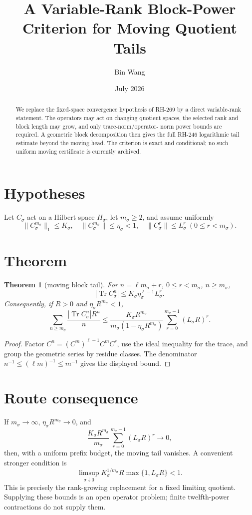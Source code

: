 \documentclass[11pt]{article}
\title{A Variable-Rank Block-Power Criterion for Moving Quotient Tails}\author{Bin Wang}\date{July 2026}
\newtheorem{theorem}{Theorem}[section]\newtheorem{corollary}[theorem]{Corollary}
\begin{document}
\maketitle
\begin{abstract}
We replace the fixed-space convergence hypothesis of RH-269 by a direct
variable-rank statement.  The operators may act on changing quotient spaces,
the selected rank and block length may grow, and only trace-norm/operator-
norm power bounds are required.  A geometric block decomposition then gives
the full RH-246 logarithmic tail estimate beyond the moving head.  The
criterion is exact and conditional; no such uniform moving certificate is
currently archived.
\end{abstract}
\section{Hypotheses}
Let $C_\sigma$ act on a Hilbert space $H_\sigma$, let $m_\sigma\ge2$, and
assume uniformly
\[
 \|C_\sigma^{m_\sigma}\|_1\le K_\sigma,\quad
 \|C_\sigma^{m_\sigma}\|\le\eta_\sigma<1,\quad
 \|C_\sigma^r\|\le L_\sigma^r\ (0\le r<m_\sigma).
\]
\section{Theorem}
\begin{theorem}[moving block tail]
For $n=\ell m_\sigma+r$, $0\le r<m_\sigma$, $n\ge m_\sigma$,
\[
 |\operatorname{Tr}C_\sigma^n|
 \le K_\sigma\eta_\sigma^{\ell-1}L_\sigma^r.
\]
Consequently, if $R>0$ and $\eta_\sigma R^{m_\sigma}<1$,
\[
 \sum_{n\ge m_\sigma}\frac{|\operatorname{Tr}C_\sigma^n|R^n}{n}
 \le
 \frac{K_\sigma R^{m_\sigma}}{m_\sigma(1-\eta_\sigma R^{m_\sigma})}
 \sum_{r=0}^{m_\sigma-1}(L_\sigma R)^r.
\]
\end{theorem}
\begin{proof}
Factor $C^n=(C^m)^{\ell-1}C^mC^r$, use the ideal inequality for the trace,
and group the geometric series by residue classes.  The denominator
$n^{-1}\le(\ell m)^{-1}\le m^{-1}$ gives the displayed bound.
\end{proof}
\section{Route consequence}
If $m_\sigma\to\infty$, $\eta_\sigma R^{m_\sigma}\to0$, and
\[
 \frac{K_\sigma R^{m_\sigma}}{m_\sigma}
 \sum_{r=0}^{m_\sigma-1}(L_\sigma R)^r\longrightarrow0,
\]
then, with a uniform prefix budget, the moving tail vanishes.  A convenient
stronger condition is
\[
 \limsup_{\sigma\downarrow0}K_\sigma^{1/m_\sigma}R
 \max\{1,L_\sigma R\}<1.
\]
This is precisely the rank-growing replacement for a fixed limiting
quotient.  Supplying these bounds is an open operator problem; finite
twelfth-power contractions do not supply them.
\end{document}
